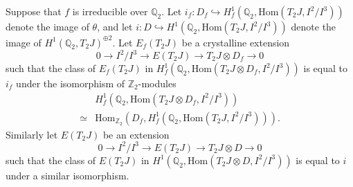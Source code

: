 \documentclass[11pt]{amsart}
\def\Z{\mathbb Z}
\def\Q{\mathbb Q}
\def\F{\mathbb F}
\theoremstyle{plain}
\theoremstyle{definition}
\newcommand{\Sym}{\mathrm{Sym}}
\newcommand{\Hom}{\mathrm{Hom}}
\begin{document}

Suppose that $f$ is irreducible over $\Q _2$. Let $i _f :D_f \hookrightarrow  H^1 _f (\Q _2 ,\Hom (T_2 J,I^2 /I^3 ))$ denote the image of $\theta $, and let $i : D\hookrightarrow H^1 (\Q _2 ,\Hom (T_2 J,I^2 /I^3 ))$ denote the image of $H^1  (\Q _2 ,T_2 J)^{\oplus 2}$. Let $E_f (T_2 J)$ be a crystalline extension
\[
0\to I^2 /I^3 \to E(T_2 J)\to T_2 J\otimes D_f \to 0
\]
such that the class of $E_f (T_2 J)$ in $H^1 _f (\Q _2 , \Hom (T_2 J\otimes D_f ,I^2 /I^3 ))$ is equal to $i _f$ under the isomorphism of $\Z _2 $-modules
\begin{align*}
& H^1 _f (\Q _2 ,\Hom (T_2 J\otimes D_f ,I^2 /I^3 )) \\
\simeq & \Hom _{\Z _2 } (D_f ,H^1 _f (\Q _2 ,\Hom (T_2 J,I^2 /I^3 ))).
\end{align*}
Similarly let $E(T_2 J)$ be an extension 
\[
0\to I^2 /I^3 \to E(T_2 J)\to T_2 J\otimes D \to 0
\]
such that the class of $E(T_2 J)$ in $H^1 (\Q _2 ,\Hom (T_2 J\otimes D,I^2 /I^3 ))$ is equal to $i$ under a similar isomorphism.
\end{document}
